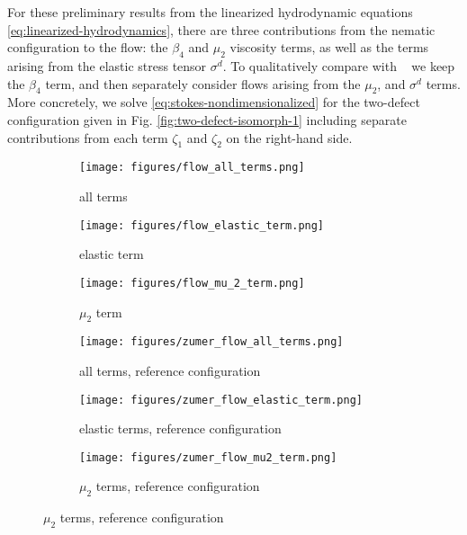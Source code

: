 \documentclass[reqno]{article}
\begin{document}
  For these preliminary results from the linearized hydrodynamic equations
  \eqref{eq:linearized-hydrodynamics}, there are three
  contributions from the nematic configuration to the flow: the $\beta_4$ and
  $\mu_2$ viscosity terms, as well as the terms arising from the elastic
  stress tensor $\sigma^d$.
  To qualitatively compare with ~\cite{svensek_complex_2002} we keep the $\beta_4$ term, and
  then separately consider flows arising from the $\mu_2$, and $\sigma^d$ terms.
  More concretely, we solve \eqref{eq:stokes-nondimensionalized} for the
  two-defect configuration given in Fig. \ref{fig:two-defect-isomorph-1}
  including separate contributions from each term $\zeta_1$ and $\zeta_2$ on the
  right-hand side. 
  
  \begin{figure}[h]
    \centering
    \begin{subfigure}{0.3\textwidth}
      \texttt{[image: figures/flow\_all\_terms.png]}
      \caption{all terms}
      \label{fig:flow_all_terms}
    \end{subfigure}
    \hfill
    \begin{subfigure}{0.3\textwidth}
      \texttt{[image: figures/flow\_elastic\_term.png]}
      \caption{elastic term}
      \label{fig:flow_elastic_term}
    \end{subfigure}
    \hfill
    \begin{subfigure}{0.3\textwidth}
      \texttt{[image: figures/flow\_mu\_2\_term.png]}
      \caption{$\mu_2$ term}
      \label{fig:flow_mu_2_term}
    \end{subfigure}
    \hfill
    \begin{subfigure}{0.3\textwidth}
      \texttt{[image: figures/zumer\_flow\_all\_terms.png]}
      \caption{all terms, reference configuration}
      \label{fig:flow_all_terms_zumer}
    \end{subfigure}
    \hfill
    \begin{subfigure}{0.3\textwidth}
      \texttt{[image: figures/zumer\_flow\_elastic\_term.png]}
      \caption{elastic terms, reference configuration}
      \label{fig:flow_elastic_term_zumer}
    \end{subfigure}
    \hfill
    \begin{subfigure}{0.3\textwidth}
      \texttt{[image: figures/zumer\_flow\_mu2\_term.png]}
      \caption{$\mu_2$ terms, reference configuration}
      \label{fig:flow_mu_2_term_zumer}
    \end{subfigure}

\end{figure}
\end{document}
